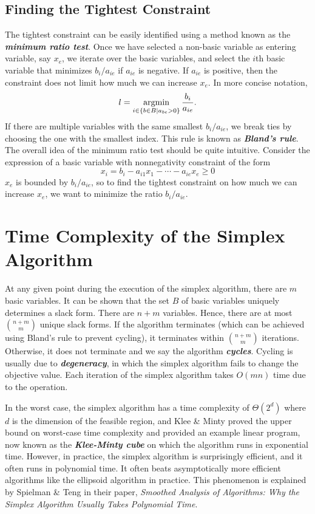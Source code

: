 \subsection{Finding the Tightest Constraint} 

The tightest constraint can be easily identified using a method known as the \textit{\textbf{minimum ratio test}}. Once we have selected a non-basic variable as entering variable, say $x_e$, we iterate over the basic variables, and select the $i$th basic variable that minimizes $b_i/a_{ie}$ if $a_{ie}$ is negative. If $a_{ie}$ is positive, then the constraint does not limit how much we can increase $x_e$. In more concise notation, 
$$
l = \operatorname*{\mathrm{argmin}}_{i \in \{b \in B \mid a_{be} > 0\}} \frac{b_i}{a_{ie}}.
$$
If there are multiple variables with the same smallest $b_i/a_{ie}$, we break ties by choosing the one with the smallest index. This rule is known as \textit{\textbf{Bland's rule}}. The overall idea of the minimum ratio test should be quite intuitive. Consider the expression of a basic variable with nonnegativity constraint of the form 
$$
x_i = b_i - a_{i1} x_1 - \cdots - a_{ie} x_e \geq 0
$$
$x_e$ is bounded by $b_i/a_{ie}$, so to find the tightest constraint on how much we can increase $x_e$, we want to minimize the ratio $b_i/a_{ie}$.

\section{Time Complexity of the Simplex Algorithm}

At any given point during the execution of the simplex algorithm, there are $m$ basic variables. It can be shown that the set $B$ of basic variables uniquely determines a slack form. There are $n+m$ variables. Hence, there are at most ${n+m \choose m}$ unique slack forms. If the algorithm terminates (which can be achieved using Bland's rule to prevent cycling), it terminates within ${n+m \choose m}$ iterations. Otherwise, it does not terminate and we say the algorithm \textit{\textbf{cycles}}. Cycling is usually due to \textit{\textbf{degeneracy}}, in which the simplex algorithm fails to change the objective value. Each iteration of the simplex algorithm takes $O(mn)$ time due to the  operation.

In the worst case, the simplex algorithm has a time complexity of $\Theta(2^d)$ where $d$ is the dimension of the feasible region, and Klee \& Minty proved the upper bound on worst-case time complexity and provided an example linear program, now known as the \textit{\textbf{Klee-Minty cube}} on which the algorithm runs in exponential time. However, in practice, the simplex algorithm is surprisingly efficient, and it often runs in polynomial time. It often beats asymptotically more efficient algorithms like the ellipsoid algorithm in practice. This phenomenon is explained by Spielman \& Teng in their paper, \textit{Smoothed Analysis of Algorithms: Why the Simplex Algorithm Usually Takes Polynomial Time}.